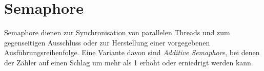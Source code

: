 \section{Semaphore}

Semaphore dienen zur Synchronisation von parallelen Threads und zum gegenseitigen Ausschluss oder zur Herstellung einer vorgegebenen Ausführungsreihenfolge.
Eine Variante davon sind \textit{Additive Semaphore}, bei denen der Zähler auf einen Schlag um mehr als 1 erhöht oder erniedrigt werden kann.

